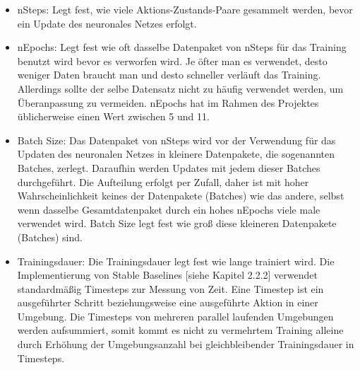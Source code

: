 \begin{itemize}
\item nSteps: Legt fest, wie viele Aktions-Zustands-Paare gesammelt werden, bevor ein Update des neuronales Netzes erfolgt.

\item nEpochs: Legt fest wie oft dasselbe Datenpaket von nSteps für das Training benutzt wird bevor es verworfen wird. Je öfter man es verwendet, desto weniger Daten braucht man und desto schneller verläuft das Training. Allerdings sollte der selbe Datensatz nicht zu häufig verwendet werden, um Überanpassung zu vermeiden. nEpochs hat im Rahmen des Projektes üblicherweise einen Wert zwischen 5 und 11.

\item Batch Size: Das Datenpaket von nSteps wird vor der Verwendung für das Updaten des neuronalen Netzes in kleinere Datenpakete, die sogenannten Batches, zerlegt. Daraufhin werden Updates mit jedem dieser Batches durchgeführt. Die Aufteilung erfolgt per Zufall, daher ist mit hoher Wahrscheinlichkeit keines der Datenpakete (Batches) wie das andere, selbst wenn dasselbe Gesamtdatenpaket durch ein hohes nEpochs viele male verwendet wird. Batch Size legt fest wie groß diese kleineren Datenpakete (Batches) sind.

\item 
Trainingsdauer: Die Trainingsdauer legt fest wie lange trainiert wird. Die Implementierung von Stable Baselines [siehe Kapitel 2.2.2] verwendet standardmäßig Timesteps zur Messung von Zeit. Eine Timestep ist ein ausgeführter Schritt beziehungsweise eine ausgeführte Aktion in einer Umgebung. Die Timesteps von mehreren parallel laufenden Umgebungen werden aufsummiert, somit kommt es nicht zu vermehrtem Training alleine durch Erhöhung der Umgebungsanzahl bei gleichbleibender Trainingsdauer in Timesteps.
\end{itemize}